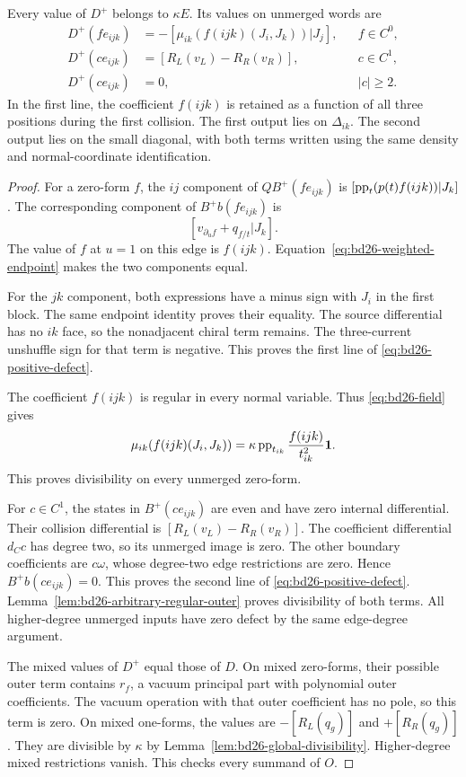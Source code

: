 \begin{proposition}\label{prop:bd26-complete-defect}
Every value of $D^+$ belongs to $\kappa E$.
Its values on unmerged words are
\begin{equation}\label{eq:bd26-positive-defect}
 \begin{aligned}
 D^+(fe_{ijk})&=-[\mu_{ik}(f(ijk)(J_i,J_k))|J_j],
                    &&f\in C^0,\\
 D^+(ce_{ijk})&=[R_L(v_L)-R_R(v_R)],
                    &&c\in C^1,\\
 D^+(ce_{ijk})&=0, &&|c|\geq2.
 \end{aligned}
\end{equation}
In the first line, the coefficient $f(ijk)$ is retained as a function of all three positions during the first collision.
The first output lies on $\Delta_{ik}$.
The second output lies on the small diagonal, with both terms written using the same density and normal-coordinate identification.
\end{proposition}
\begin{proof}
For a zero-form $f$, the $ij$ component of $QB^+(fe_{ijk})$ is
$[\operatorname{pp}_t(p(t)f(ijk))|J_k]$.
The corresponding component of $B^+b(fe_{ijk})$ is
\[
 [v_{\partial_uf}+q_{f/t}|J_k].
\]
The value of $f$ at $u=1$ on this edge is $f(ijk)$.
Equation~\eqref{eq:bd26-weighted-endpoint} makes the two components equal.

For the $jk$ component, both expressions have a minus sign with $J_i$ in the first block.
The same endpoint identity proves their equality.
The source differential has no $ik$ face, so the nonadjacent chiral term remains.
The three-current unshuffle sign for that term is negative.
This proves the first line of \eqref{eq:bd26-positive-defect}.

The coefficient $f(ijk)$ is regular in every normal variable.
Thus \eqref{eq:bd26-field} gives
\[
 \mu_{ik}(f(ijk)(J_i,J_k))
 =\kappa\operatorname{pp}_{t_{ik}}\frac{f(ijk)}{t_{ik}^2}\mathbf1.
\]
This proves divisibility on every unmerged zero-form.

For $c\in C^1$, the states in $B^+(ce_{ijk})$ are even and have zero internal differential.
Their collision differential is $[R_L(v_L)-R_R(v_R)]$.
The coefficient differential $d_Cc$ has degree two, so its unmerged image is zero.
The other boundary coefficients are $c\omega$, whose degree-two edge restrictions are zero.
Hence $B^+b(ce_{ijk})=0$.
This proves the second line of \eqref{eq:bd26-positive-defect}.
Lemma~\ref{lem:bd26-arbitrary-regular-outer} proves divisibility of both terms.
All higher-degree unmerged inputs have zero defect by the same edge-degree argument.

The mixed values of $D^+$ equal those of $D$.
On mixed zero-forms, their possible outer term contains $r_f$, a vacuum principal part with polynomial outer coefficients.
The vacuum operation with that outer coefficient has no pole, so this term is zero.
On mixed one-forms, the values are $-[R_L(q_g)]$ and $+[R_R(q_g)]$.
They are divisible by $\kappa$ by Lemma~\ref{lem:bd26-global-divisibility}.
Higher-degree mixed restrictions vanish.
This checks every summand of $O$.
\end{proof}

